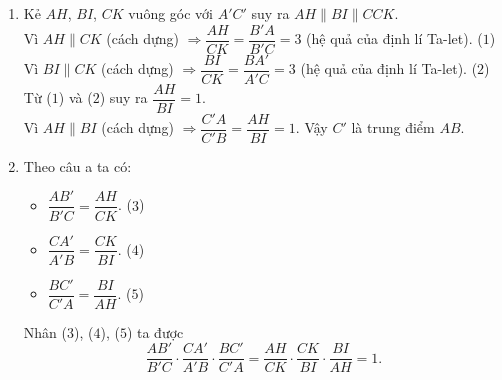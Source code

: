 \begin{bt}
{\begin{center}
		\end{center}
		\begin{enumerate}
			\item Kẻ $ AH $, $ BI $, $ CK $ vuông góc với $ A'C' $ suy ra $ AH \parallel BI \parallel CCK $.\\
			Vì $ AH \parallel CK$ (cách dựng) $\Rightarrow \dfrac{AH}{CK}=\dfrac{B'A}{B'C}=3 $ (hệ quả của định lí Ta-let). \hfill($ 1 $)\\
			Vì $ BI \parallel CK$ (cách dựng) $\Rightarrow \dfrac{BI}{CK}=\dfrac{BA'}{A'C}=3 $ (hệ quả của định lí Ta-let). \hfill($ 2 $)\\
			Từ ($ 1 $) và ($ 2 $) suy ra $ \dfrac{AH}{BI}=1 $.\\
			Vì $ AH \parallel BI$ (cách dựng) $\Rightarrow \dfrac{C'A}{C'B}=\dfrac{AH}{BI}=1$. Vậy $ C' $ là trung điểm $ AB $.
			\item Theo câu a ta có:
			\begin{itemize}
				\item $ \dfrac{AB'}{B'C}=\dfrac{AH}{CK} $. \hfill($ 3 $)
				\item $ \dfrac{CA'}{A'B}=\dfrac{CK}{BI} $. \hfill($ 4 $)
				\item $ \dfrac{BC'}{C'A}=\dfrac{BI}{AH} $. \hfill($ 5 $)
			\end{itemize}
			Nhân ($ 3 $), ($ 4 $), ($ 5 $) ta được 
			$$ \dfrac{AB'}{B'C} \cdot \dfrac{CA'}{A'B} \cdot \dfrac{BC'}{C'A}=\dfrac{AH}{CK} \cdot \dfrac{CK}{BI} \cdot \dfrac{BI}{AH}=1.$$
		\end{enumerate}
		
	}
\end{bt}

